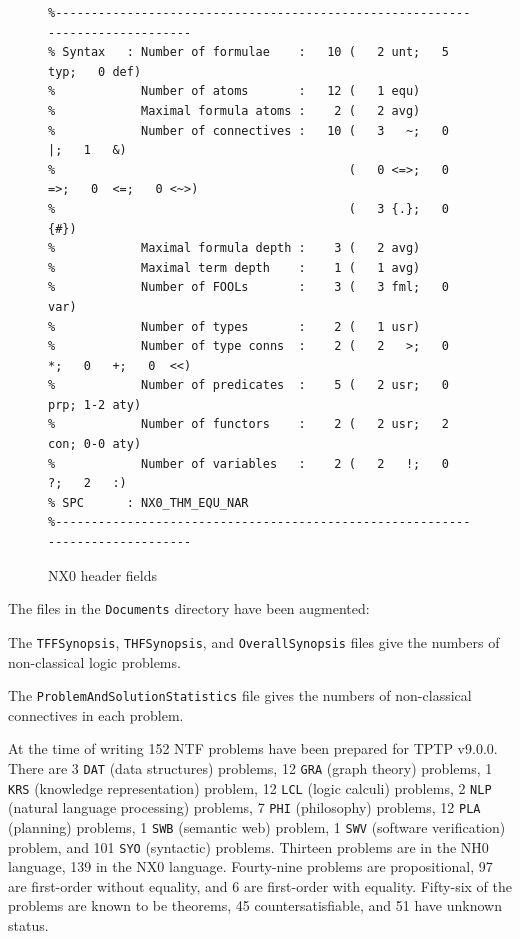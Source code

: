 \documentclass{ceurart}
\newenvironment{packed_itemize}{
\vspace*{-0.3em}
\begin{itemize}
\setlength{\partopsep}{0pt}
\setlength{\itemsep}{1pt}
\setlength{\parskip}{0pt}
\setlength{\parsep}{0pt}
}{\end{itemize}}
\begin{document}
\begin{figure}[h!]
\small
{}
\begin{verbatim}
%------------------------------------------------------------------------------
% Syntax   : Number of formulae    :   10 (   2 unt;   5 typ;   0 def)
%            Number of atoms       :   12 (   1 equ)
%            Maximal formula atoms :    2 (   2 avg)
%            Number of connectives :   10 (   3   ~;   0   |;   1   &)
%                                         (   0 <=>;   0  =>;   0  <=;   0 <~>)
%                                         (   3 {.};   0 {#})
%            Maximal formula depth :    3 (   2 avg)
%            Maximal term depth    :    1 (   1 avg)
%            Number of FOOLs       :    3 (   3 fml;   0 var)
%            Number of types       :    2 (   1 usr)
%            Number of type conns  :    2 (   2   >;   0   *;   0   +;   0  <<)
%            Number of predicates  :    5 (   2 usr;   0 prp; 1-2 aty)
%            Number of functors    :    2 (   2 usr;   2 con; 0-0 aty)
%            Number of variables   :    2 (   2   !;   0   ?;   2   :)
% SPC      : NX0_THM_EQU_NAR
%------------------------------------------------------------------------------
\end{verbatim}
\caption{NX0 header fields}
\label{NX0Header}
\end{figure}

The files in the {\tt Documents} directory have been augmented:
\begin{packed_itemize}
\item The {\tt TFFSynopsis}, {\tt THFSynopsis}, and {\tt OverallSynopsis} files give the numbers 
      of non-classical logic problems.
\item The {\tt ProblemAndSolutionStatistics} file gives the numbers of non-classical
      connectives in each problem.
\end{packed_itemize}

At the time of writing 152 NTF problems have been prepared for TPTP v9.0.0.
There are 3 {\tt DAT} (data structures) problems, 12 {\tt GRA} (graph theory) problems, 
1 {\tt KRS} (knowledge representation) problem, 12 {\tt LCL} (logic calculi) problems, 
2 {\tt NLP} (natural language processing) problems, 7 {\tt PHI} (philosophy) problems,
12 {\tt PLA} (planning) problems, 1 {\tt SWB} (semantic web) problem, 1 {\tt SWV} (software 
verification) problem, and 101 {\tt SYO} (syntactic) problems.
Thirteen problems are in the NH0 language, 139 in the NX0 language.
Fourty-nine problems are propositional, 97 are first-order without equality, and 6 are
first-order with equality.
Fifty-six of the problems are known to be theorems, 45 countersatisfiable, and 51 have unknown
status.
\end{document}
